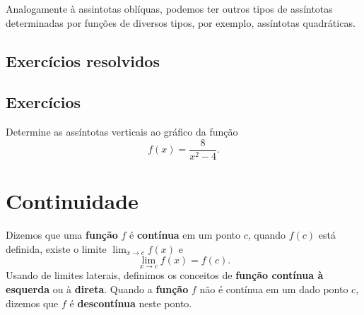 \begin{obs}
  Analogamente à assintotas oblíquas, podemos ter outros tipos de assíntotas determinadas por funções de diversos tipos, por exemplo, assíntotas quadráticas.
\end{obs}

\subsection*{Exercícios resolvidos}

\emconstrucao

\subsection*{Exercícios}

\begin{exer}
  Determine as assíntotas verticais ao gráfico da função
  \begin{equation}
    f(x) = \frac{8}{x^2-4}.
  \end{equation}
\end{exer}

\emconstrucao

\section{Continuidade}\label{cap_lim_sec_cont}

Dizemos que uma {\bf função} $f$ é {\bf contínua}  em um ponto $c$, quando $f(c)$ está definida, existe o limite $\lim_{x\to c} f(x)$ e
\begin{equation}
  \lim_{x\to c} f(x) = f(c).
\end{equation}
Usando de limites laterais, definimos os conceitos de {\bf função contínua à esquerda} ou à {\bf direta}. Quando a {\bf função} $f$ não é contínua em um dado ponto $c$, dizemos que $f$ é {\bf descontínua} neste ponto.

